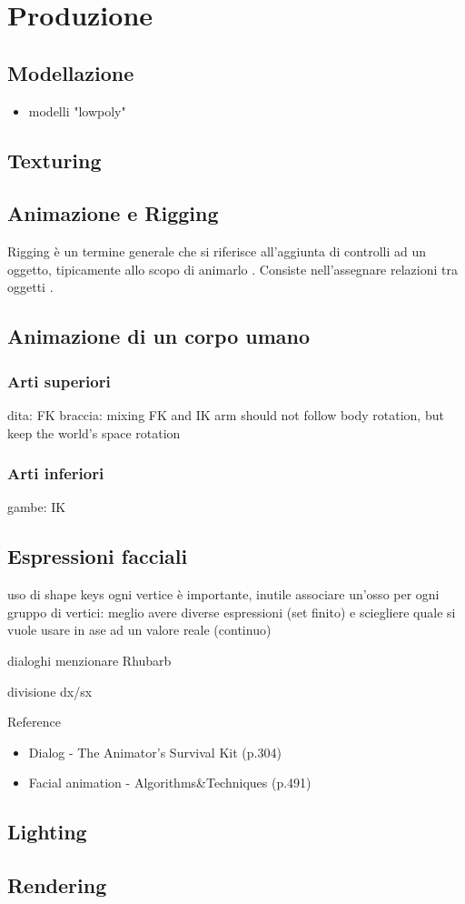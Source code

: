 
\chapter{Produzione} %

\label{Chapter5} %


\section{Modellazione}
\begin{itemize}
    \item modelli "lowpoly"
\end{itemize}
\section{Texturing}
\section{Animazione e Rigging}
Rigging è un termine generale che si riferisce all'aggiunta di controlli ad un oggetto, tipicamente allo scopo di animarlo \parencite{blendDoc}.
Consiste nell'assegnare relazioni tra oggetti \parencite{BlendTut}.
\section{Animazione di un corpo umano}
\subsection{Arti superiori}
dita: FK
braccia: mixing FK and IK
         arm should not follow body rotation, but keep the world's space rotation
\subsection{Arti inferiori}
gambe: IK
\section{Espressioni facciali}
uso di shape keys
ogni vertice è importante, inutile associare un'osso per ogni gruppo di vertici: meglio avere diverse espressioni (set finito) e sciegliere quale si vuole usare in ase ad un valore reale (continuo)

dialoghi
menzionare Rhubarb

divisione dx/sx

Reference
\begin{itemize}
    \item Dialog - The Animator's Survival Kit (p.304) 
    \item Facial animation - Algorithms\&Techniques (p.491)
\end{itemize}
\section{Lighting}
\section{Rendering}

